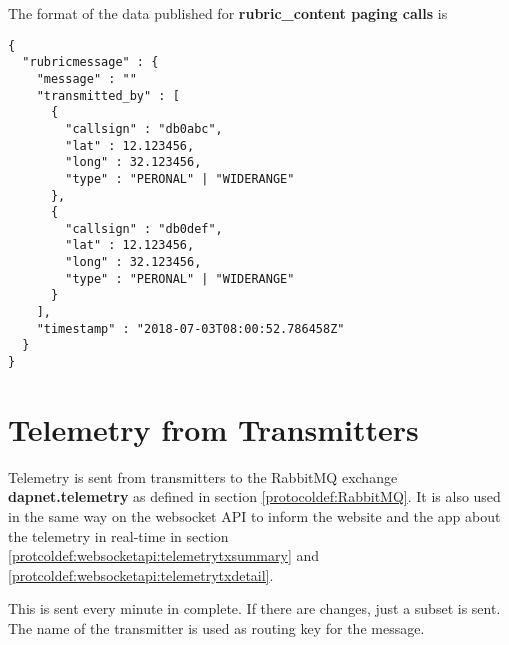 The format of the data published for \textbf{rubric\_content paging calls} is
\begin{lstlisting}
{
  "rubricmessage" : {
    "message" : ""
    "transmitted_by" : [
      {
        "callsign" : "db0abc",
        "lat" : 12.123456,
        "long" : 32.123456,
        "type" : "PERONAL" | "WIDERANGE"
      },
      {
        "callsign" : "db0def",
        "lat" : 12.123456,
        "long" : 32.123456,
        "type" : "PERONAL" | "WIDERANGE"
      }
    ],
    "timestamp" : "2018-07-03T08:00:52.786458Z"
  }
}
\end{lstlisting}

\section{Telemetry from Transmitters}
\label{protocoldef:telemetrytx}
Telemetry is sent from transmitters to the RabbitMQ exchange
\textbf{dapnet.telemetry} as defined in section \ref{protocoldef:RabbitMQ}. It
is also used in the same way on the websocket API to inform the website and the
app about the telemetry in real-time in section
\ref{protcoldef:websocketapi:telemetrytxsummary} and \ref{protcoldef:websocketapi:telemetrytxdetail}.

This is sent every minute in complete. If there are changes, just a subset is sent.
The name of the transmitter is used as routing key for the message.

